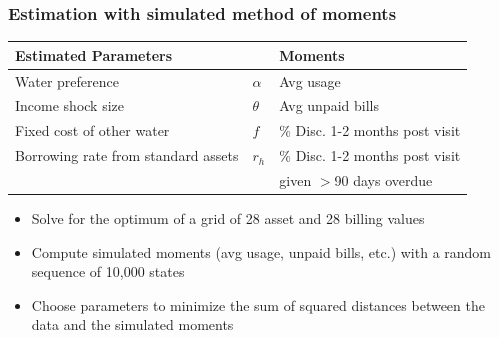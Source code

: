 \documentclass[aspectratio=149]{beamer}
\begin{document}
\begin{frame}

\frametitle{Estimation with simulated method of moments}

\begin{table}[H]
\centering
\begin{tabular}{l*{1}{ll}}
Estimated Parameters  & & Moments \\[.5em]
\toprule
Water preference & $\alpha $ & {\footnotesize   Avg usage   } \\[.1em]
Income shock size  & $\theta $ & {\footnotesize  Avg unpaid bills } \\[.1em]
Fixed cost of other water  &  $f$ & {\footnotesize  \% Disc. 1-2 months post visit } \\[.1em]
Borrowing rate from standard assets & $r_h$ & \% {\footnotesize  Disc. 1-2 months post visit } \\
 & &  {\footnotesize \hspace{4mm} given $>$90 days overdue} \\
\end{tabular}
\end{table}

\begin{itemize}
\item Solve for the optimum of a grid of 28 asset and 28 billing values
\item Compute simulated moments (avg usage, unpaid bills, etc.) with a random sequence of 10,000 states
\item Choose parameters to minimize the sum of squared distances between the data and the simulated moments
\end{itemize}

\end{frame}
\end{document}
